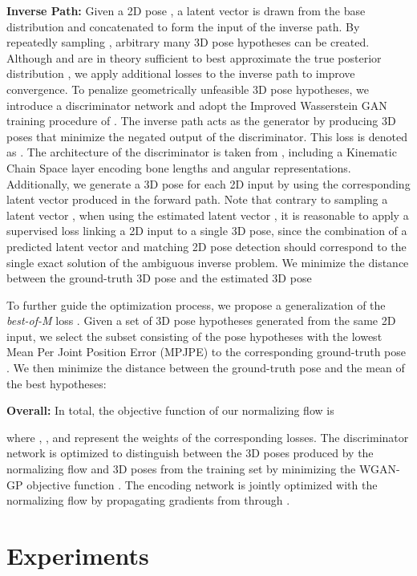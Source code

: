 \documentclass[10pt,twocolumn,letterpaper]{article}
\begin{document}
\textbf{Inverse Path:} 
Given a 2D pose , a latent vector  is drawn from the base distribution  and concatenated to form the input  of the inverse path. By repeatedly sampling , arbitrary many 3D pose hypotheses can be created.
Although  and  are in theory sufficient to best approximate the true posterior distribution \cite{ArdizzoneINN}, we apply additional losses to the inverse path to improve convergence. 
To penalize geometrically unfeasible 3D pose hypotheses, we introduce a discriminator network and adopt the Improved Wasserstein GAN training procedure of \cite{NIPS2017_wgangp}. The inverse path acts as the generator by producing 3D poses that minimize the negated output of the discriminator. This loss is denoted as .
The architecture of the discriminator is taken from \cite{Wandt2019RepNet}, including a Kinematic Chain Space layer \cite{WanAck2018a} encoding bone lengths and angular representations. 
Additionally, we generate a 3D pose for each 2D input by using the corresponding latent vector  produced in the forward path. Note that contrary to sampling a latent vector , when using the estimated latent vector , it is reasonable to apply a supervised loss  linking a 2D input to a single 3D pose, since the combination of a predicted latent vector and matching 2D pose detection should correspond to the single exact solution of the ambiguous inverse problem. We minimize the  distance between the ground-truth 3D pose  and the estimated 3D pose 

To further guide the optimization process, we propose a generalization of the \textit{best-of-M} loss \cite{NIPS2012_cfbce4c1}. 
Given a set of 3D pose hypotheses  generated from the same 2D input, we select the subset  consisting of the  pose hypotheses with the lowest Mean Per Joint Position Error (MPJPE) to the corresponding ground-truth pose .
We then minimize the  distance between the ground-truth pose  and the mean of the  best hypotheses:


\textbf{Overall:}
In total, the objective function of our normalizing flow is

where , ,  and  represent the weights of the corresponding losses. The discriminator network is optimized to distinguish between the 3D poses produced by the normalizing flow and 3D poses from the training set by minimizing the WGAN-GP objective function \cite{NIPS2017_wgangp}.
The encoding network  is jointly optimized with the normalizing flow by propagating gradients from  through .

\section{Experiments}
\end{document}
